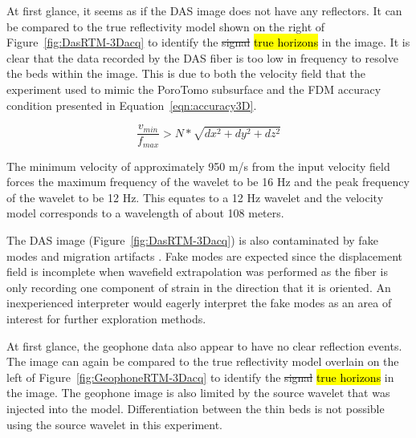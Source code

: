 

At first glance, it seems as if the DAS image does not have any reflectors. It can be compared to the true reflectivity model shown on the right of Figure~\ref{fig:DasRTM-3Dacq} to identify the \sout{signal} \hl{true horizons} in the image. It is clear that the data recorded by the DAS fiber is too low in frequency to resolve the beds within the image. This is due to both the velocity field that the experiment used to mimic the PoroTomo subsurface and the FDM accuracy condition presented in Equation~\ref{eqn:accuracy3D}.

\begin{equation}
  \frac{v_{min}}{f_{max}} > N * \sqrt{dx^2+dy^2+dz^2}
\label{eqn:accuracy3D}
\end{equation}

The minimum velocity of approximately 950 m/s from the input velocity field forces the maximum frequency of the wavelet to be 16 Hz and the peak frequency of the wavelet to be 12 Hz. This equates to a 12 Hz wavelet and the velocity model corresponds to a wavelength of about 108 meters.

The DAS image (Figure~\ref{fig:DasRTM-3Dacq}) is also contaminated by fake modes and migration artifacts \citep{rocha2016isotropic}. Fake modes are expected since the displacement field is incomplete when wavefield extrapolation was performed as the fiber is only recording one component of strain in the direction that it is oriented. An inexperienced interpreter would eagerly interpret the fake modes as an area of interest for further exploration methods.

At first glance, the geophone data also appear to have no clear reflection events. The image can again be compared to the true reflectivity model overlain on the left of Figure~\ref{fig:GeophoneRTM-3Dacq} to identify the \sout{signal} \hl{true horizons} in the image. The geophone image is also limited by the source wavelet that was injected into the model. Differentiation between the thin beds is not possible using the source wavelet in this experiment.

